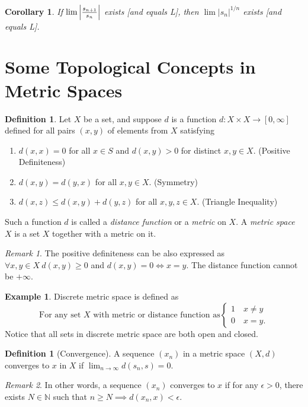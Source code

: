 \documentclass[12pt, lettersize]{book}
\theoremstyle{plain}
\newtheorem{cor}{Corollary}[thm]
\theoremstyle{definition}
\newtheorem{dfn}[thm]{Definition}
\newtheorem*{eg}{Example}
\theoremstyle{remark}
\newtheorem*{rem}{Remark}
\newcommand{\N}{\mathbb{N}}
\begin{document}
		\begin{cor}\label{def:12.3}
		If $\lim\abs{\frac{s_{n+1}}{s_n}}$ exists [and equals L], then $\lim|s_n|^{1/n}$ exists [and equals L].
		\end{cor}
		
		\newpage
	\section{Some Topological Concepts in Metric Spaces}
	\begin{dfn}
		Let $X$ be a set, and suppose $d$ is a function $d: X\times X\rightarrow[0,\infty]$ defined for all pairs $(x,y)$ of elements from $X$ satisfying
		\begin{enumerate}
			\item $d(x,x)=0$ for all $x\in S$ and $d(x,y)>0$ for distinct $x,y\in X$. (Positive Definiteness)
			\item $d(x,y)=d(y,x)$ for all $x,y\in X$. (Symmetry)
			\item $d(x,z)\leq d(x,y)+d(y,z)$ for all $x,y,z\in X$. (Triangle Inequality)
		\end{enumerate}
		Such a function $d$ is called a \emph{distance function} or a \emph{metric} on $X$. A \emph{metric space} $X$ is a set $X$ together with a metric on it.
	\end{dfn}
	\begin{rem}
		The positive definiteness can be also expressed as $\forall x,y\in X\ d(x,y)\geq 0$ and $d(x,y)=0\iff x=y$. The distance function cannot be $+\infty$.
	\end{rem}
	\begin{eg}
		Discrete metric space is defined as
		\begin{displaymath}
			\text{For any set $X$ with metric or distance function as}\begin{cases}
				1\quad\text{$x\neq y$}\\ 0\quad\text{$x=y$}.
			\end{cases}
		\end{displaymath}
		Notice that all sets in discrete metric space are both open and closed.
	\end{eg}
	
	\begin{dfn}[Convergence]
		A sequence $(x_n)$ in a metric space $(X,d)$ converges to $x$ in $X$ if $\lim_{n\rightarrow\infty}d(s_n,s)=0$.
	\end{dfn}
	\begin{rem}
		In other words, a sequence $(x_n)$ converges to $x$ if for any $\epsilon>0$, there exists $N\in\N$ such that $n\geq N\implies d(x_n,x)<\epsilon$.
	\end{rem}
	
\end{document}
